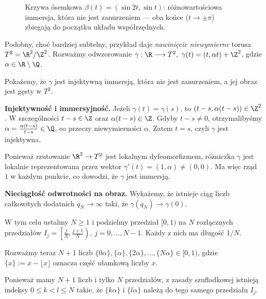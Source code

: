 \begin{figure}[h]
\centering
{}
\caption{Krzywa ósemkowa $\beta(t)=(\sin2t,\sin t)$: różnowartościowa immersja, która nie
jest zanurzeniem — oba końce ($t\to\pm\pi$) zbiegają do początku układu współrzędnych.}
\label{fig:osemka}
\end{figure}


\begin{uwaga}
Podobny, choć bardziej subtelny, przykład daje
\emph{nawinięcie niewymierne} torusa
$T^2=\R^2/\Z^2$. Rozważmy odwzorowanie $\gamma:\R\longrightarrow T^2, \ \gamma(t)=(t,\alpha t)+\Z^2$,
gdzie $\alpha\in\R\setminus\Q$.

Pokażemy, że $\gamma$ jest injektywną immersją,
która nie jest zanurzeniem, a jej obraz
jest gęsty w $T^2$.

\smallskip
\noindent\textbf{Injektywność i immersyjność.}
Jeżeli $\gamma(t)=\gamma(s)$, to $(t-s,\alpha(t-s))\in\Z^2$.
W szczególności $t-s\in\Z$ oraz
$\alpha(t-s)\in\Z$. Gdyby $t-s\ne0$,
otrzymalibyśmy $\alpha=\frac{\alpha(t-s)}{t-s}\in\Q$,
co przeczy niewymierności $\alpha$.
Zatem $t=s$, czyli $\gamma$ jest injektywna.

Ponieważ rzutowanie $\R^2\to T^2$ jest lokalnym
dyfeomorfizmem, różniczka $\gamma$ jest lokalnie
reprezentowana przez wektor $\gamma'(t)=(1,\alpha)\ne(0,0)$.
Ma więc rząd $1$ w każdym punkcie, co dowodzi,
że $\gamma$ jest immersją.

\smallskip
\noindent\textbf{Nieciągłość odwrotności na obraz.}
Wykażemy, że istnieje ciąg liczb całkowitych
dodatnich $q_N\to\infty$ taki, że $\gamma(q_N)\longrightarrow\gamma(0)$.

W tym celu ustalmy $N\ge1$ i podzielmy przedział
$[0,1)$ na $N$ rozłącznych przedziałów $I_j=\left[\frac{j}{N},\frac{j+1}{N}\right), \ j=0,\ldots,N-1$.
Każdy z nich ma długość $1/N$.

Rozważmy teraz $N+1$ liczb $\{0\alpha\},\{\alpha\},\{2\alpha\}, \ldots,\{N\alpha\}\in[0,1)$,
gdzie $\{x\}:=x-\lfloor x\rfloor$ oznacza
część ułamkową liczby $x$.

Ponieważ mamy $N+1$ liczb i tylko $N$
przedziałów, z zasady szufladkowej istnieją
indeksy $0\le k<l\le N$ takie, że
$\{k\alpha\}$ i $\{l\alpha\}$ należą do
tego samego przedziału $I_j$.


\end{uwaga}
